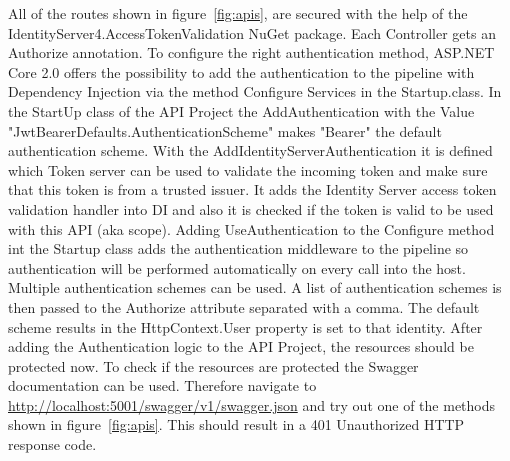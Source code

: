 All of the routes shown in figure~\ref{fig:apis}, are secured with the help of the IdentityServer4.AccessTokenValidation NuGet package. Each Controller gets an Authorize annotation. 
To configure the right authentication method, ASP.NET Core 2.0 offers the possibility to add the authentication to the pipeline with Dependency Injection via the method Configure Services in the Startup.class.
In the StartUp class of the API Project the AddAuthentication with the Value "JwtBearerDefaults.AuthenticationScheme" makes "Bearer" the default authentication scheme. With the AddIdentityServerAuthentication it is defined which Token server can be used to validate the incoming token and make sure that this token is from a trusted issuer. It adds the Identity Server access token validation handler into DI and also it is checked if the token is valid to be used with this API (aka scope). Adding UseAuthentication to the Configure method int the Startup class adds the authentication middleware to the pipeline so authentication will be performed automatically on every call into the host.  Multiple authentication schemes can be used. A list of authentication schemes is then passed to the Authorize attribute separated with a comma. The default scheme results in the HttpContext.User property is set to that identity. After adding the Authentication logic to the API Project, the resources should be protected now. To check if the resources are protected the Swagger documentation can be used. Therefore navigate to \url{http://localhost:5001/swagger/v1/swagger.json} and try out one of the methods shown in figure~\ref{fig:apis}. This should result in a 401 Unauthorized HTTP response code.


